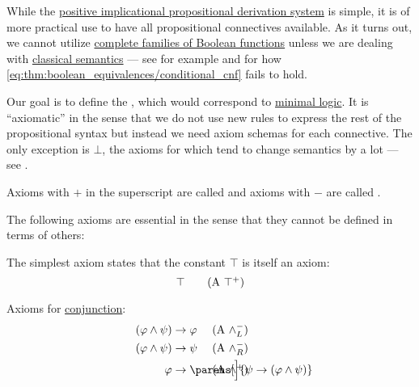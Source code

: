 \begin{definition}\label{def:minimal_propositional_derivation_system}
  While the \hyperref[def:positive_implicational_propositional_derivation_system]{positive implicational propositional derivation system} is simple, it is of more practical use to have all propositional connectives available. As it turns out, we cannot utilize \hyperref[ex:posts_completeness_theorem]{complete families of Boolean functions} unless we are dealing with \hyperref[def:propositional_semantics]{classical semantics} --- see for example  and  for how \cref{eq:thm:boolean_equivalences/conditional_cnf} fails to hold.

  Our goal is to define the , which would correspond to \hyperref[def:minimal_logic]{minimal logic}. It is \enquote{axiomatic} in the sense that we do not use new rules to express the rest of the propositional syntax but instead we need axiom schemas for each connective. The only exception is \hyperref[def:propositional_language/constants/verum]{\( \bot \)}, the axioms for which tend to change semantics by a lot --- see .

  Axioms with \( + \) in the superscript are called  and axioms with \( - \) are called .

  The following axioms are essential in the sense that they cannot be defined in terms of others:
  \begin{thmenum}[series=def:minimal_propositional_derivation_system]
     The simplest axiom states that the constant \hyperref[def:propositional_language/constants/verum]{\( \top \)} is itself an axiom:
    \begin{equation}\label{eq:def:minimal_propositional_derivation_system/top/intro}
      \top \tag{\textrm{A} \( \top^+ \)}
    \end{equation}

     Axioms for \hyperref[def:propositional_language/connectives/conjunction]{conjunction}:
    \begin{align}
      \mathllap{ (\varphi \wedge \psi) } &\rightarrow \mathrlap{ \varphi } \tag{\textrm{A} \( \wedge_L^- \)} \label{eq:def:minimal_propositional_derivation_system/and/elim_left} \\
      \mathllap{ (\varphi \wedge \psi) } &\rightarrow \mathrlap{ \psi } \tag{\textrm{A} \( \wedge_R^- \)} \label{eq:def:minimal_propositional_derivation_system/and/elim_right} \\
      \mathllap{ \varphi }               &\rightarrow \mathrlap{ \parens[\Big]{ \psi \rightarrow (\varphi \wedge \psi) } } \tag{\textrm{A} \( \wedge^+ \)} \label{eq:def:minimal_propositional_derivation_system/and/intro}
    \end{align}


\end{thmenum}
\end{definition}
